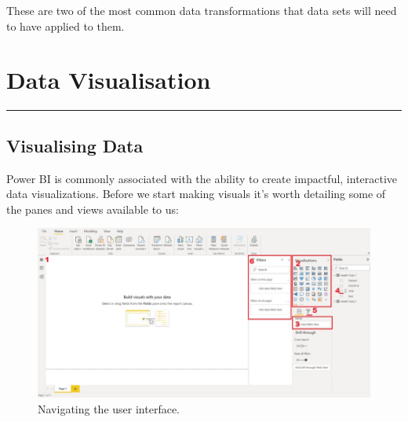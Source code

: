 \documentclass[
]{book}
\begin{document}
These are two of the most common data transformations that data sets will need to have applied to them.

\hypertarget{data-visualisation}{%
\chapter{Data Visualisation}\label{data-visualisation}}

\begin{center}\rule{0.5\linewidth}{0.5pt}\end{center}

\hypertarget{visualising-data}{%
\section{Visualising Data}\label{visualising-data}}

Power BI is commonly associated with the ability to create impactful, interactive data visualizations. Before we start making visuals it's worth detailing some of the panes and views available to us:

\begin{figure}
\centering
\includegraphics{bi5.jpg}
\caption{Navigating the user interface.}
\end{figure}
\end{document}
